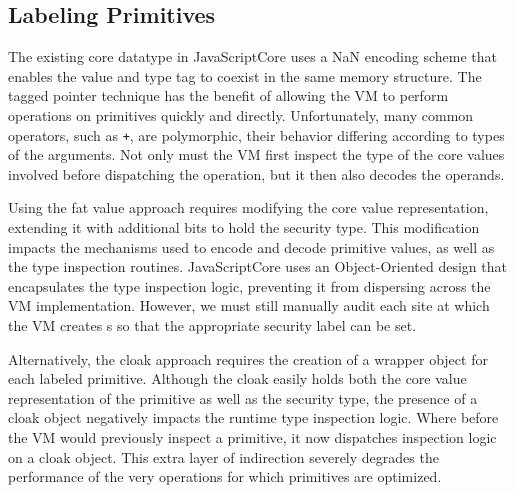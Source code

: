 \subsection{Labeling Primitives}\label{sec:primitives}


The existing core datatype in JavaScriptCore uses a NaN encoding scheme that enables the value and type tag to coexist in the same memory structure.
The tagged pointer technique has the benefit of allowing the VM to perform operations on primitives quickly and directly.
Unfortunately, many common operators, such as \texttt{+}, are polymorphic, their behavior differing according to types of the arguments.
Not only must the VM first inspect the type of the core values involved before dispatching the operation, but it then also decodes the operands. 

Using the fat value approach requires modifying the core value representation, extending it with additional bits to hold the security type.
This modification impacts the mechanisms used to encode and decode primitive values, as well as the type inspection routines.
JavaScriptCore uses an Object-Oriented design that encapsulates the type inspection logic, preventing it from dispersing across the VM implementation.
However, we must still manually audit each site at which the VM creates s so that the appropriate security label can be set.

Alternatively, the cloak approach requires the creation of a wrapper object for each labeled primitive.
Although the cloak easily holds both the core value representation of the primitive as well as the security type, the presence of a cloak object negatively impacts the runtime type inspection logic.
Where before the VM would previously inspect a primitive, it now dispatches inspection logic on a cloak object.
This extra layer of indirection severely degrades the performance of the very operations for which primitives are optimized.

